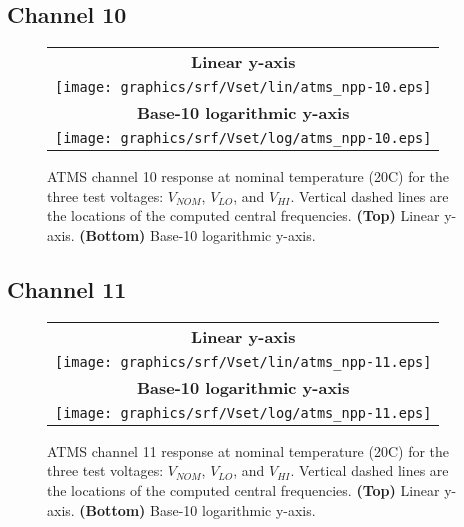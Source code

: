 \subsection{Channel 10}
\begin{figure}[H]
  \label{fig:Vset.ch10_response}
  \centering
  \begin{tabular}{c}
    \hspace{0.75cm}\sffamily\textbf{Linear y-axis} \\
    \texttt{[image: graphics/srf/Vset/lin/atms\_npp-10.eps]} \\
    \hspace{0.75cm}\sffamily\textbf{Base-10 logarithmic y-axis} \\
    \texttt{[image: graphics/srf/Vset/log/atms\_npp-10.eps]}
  \end{tabular}
  \caption{ATMS channel 10 response at nominal temperature (20\textdegree{}C) for the three test voltages: $V_{NOM}$, $V_{LO}$, and $V_{HI}$. Vertical dashed lines are the locations of the computed central frequencies. \textbf{(Top)} Linear y-axis. \textbf{(Bottom)} Base-10 logarithmic y-axis.}
\end{figure}

\subsection{Channel 11}
\begin{figure}[H]
  \label{fig:Vset.ch11_response}
  \centering
  \begin{tabular}{c}
    \hspace{0.75cm}\sffamily\textbf{Linear y-axis} \\
    \texttt{[image: graphics/srf/Vset/lin/atms\_npp-11.eps]} \\
    \hspace{0.75cm}\sffamily\textbf{Base-10 logarithmic y-axis} \\
    \texttt{[image: graphics/srf/Vset/log/atms\_npp-11.eps]}
  \end{tabular}
  \caption{ATMS channel 11 response at nominal temperature (20\textdegree{}C) for the three test voltages: $V_{NOM}$, $V_{LO}$, and $V_{HI}$. Vertical dashed lines are the locations of the computed central frequencies. \textbf{(Top)} Linear y-axis. \textbf{(Bottom)} Base-10 logarithmic y-axis.}
\end{figure}

